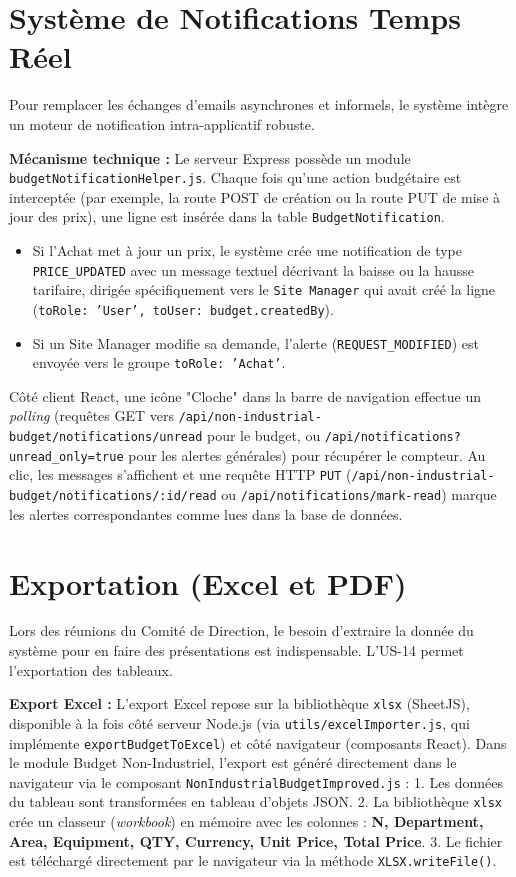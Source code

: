 \section{Système de Notifications Temps Réel}
Pour remplacer les échanges d'emails asynchrones et informels, le système intègre un moteur de notification intra-applicatif robuste.

\textbf{Mécanisme technique :}
Le serveur Express possède un module \texttt{budgetNotificationHelper.js}. Chaque fois qu'une action budgétaire est interceptée (par exemple, la route POST de création ou la route PUT de mise à jour des prix), une ligne est insérée dans la table \texttt{BudgetNotification}.
\begin{itemize}
    \item Si l'Achat met à jour un prix, le système crée une notification de type \texttt{PRICE\_UPDATED} avec un message textuel décrivant la baisse ou la hausse tarifaire, dirigée spécifiquement vers le \texttt{Site Manager} qui avait créé la ligne (\texttt{toRole: 'User', toUser: budget.createdBy}).
    \item Si un Site Manager modifie sa demande, l'alerte (\texttt{REQUEST\_MODIFIED}) est envoyée vers le groupe \texttt{toRole: 'Achat'}.
\end{itemize}

Côté client React, une icône "Cloche" dans la barre de navigation effectue un \textit{polling} (requêtes GET vers \texttt{/api/non-industrial-budget/notifications/unread} pour le budget, ou \texttt{/api/notifications?unread\_only=true} pour les alertes générales) pour récupérer le compteur. Au clic, les messages s'affichent et une requête HTTP \texttt{PUT} (\texttt{/api/non-industrial-budget/notifications/:id/read} ou \texttt{/api/notifications/mark-read}) marque les alertes correspondantes comme lues dans la base de données.

\section{Exportation (Excel et PDF)}
Lors des réunions du Comité de Direction, le besoin d'extraire la donnée du système pour en faire des présentations est indispensable. L'US-14 permet l'exportation des tableaux.

\textbf{Export Excel :}
L'export Excel repose sur la bibliothèque \texttt{xlsx} (SheetJS), disponible à la fois côté serveur Node.js (via \texttt{utils/excelImporter.js}, qui implémente \texttt{exportBudgetToExcel}) et côté navigateur (composants React). Dans le module Budget Non-Industriel, l'export est généré directement dans le navigateur via le composant \texttt{NonIndustrialBudgetImproved.js} :
1. Les données du tableau sont transformées en tableau d'objets JSON.
2. La bibliothèque \texttt{xlsx} crée un classeur (\textit{workbook}) en mémoire avec les colonnes : \textbf{N\textdegree, Department, Area, Equipment, QTY, Currency, Unit Price, Total Price}.
3. Le fichier est téléchargé directement par le navigateur via la méthode \texttt{XLSX.writeFile()}.

